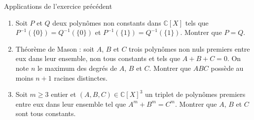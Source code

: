 \documentclass[french,a4paper]{article}
\newcommand{\C}{\mathbb{C}}
\newcommand{\inv}{^{-1}}
\theoremstyle{plain}
\theoremstyle{definition}
\theoremstyle{remark}
\begin{document}
\begin{ex}{Applications de l'exercice précédent}
	\begin{enumerate}
		\item Soit $P$ et $Q$ deux polynômes non constants dans $\C[X]$ tels que $P\inv(\{0\})=Q\inv(\{0\})$ et $P\inv(\{1\})=Q\inv(\{1\})$. Montrer que $P=Q$.
		\item Théorème de Mason : soit $A$, $B$ et $C$ trois polynômes non nuls premiers entre eux dans leur ensemble, non tous constants et tels que $A+B+C=0$. On note $n$ le maximum des degrés de $A$, $B$ et $C$. Montrer que $ABC$ possède au moins $n+1$ racines distinctes.
		\item Soit $m\geqslant 3$ entier et $(A,B,C)\in\C[X]^3$ un triplet de polynômes premiers entre eux dans leur ensemble tel que $A^m+B^m=C^m$. Montrer que $A$, $B$ et $C$ sont tous constants.
	\end{enumerate}
\end{ex}
\end{document}

